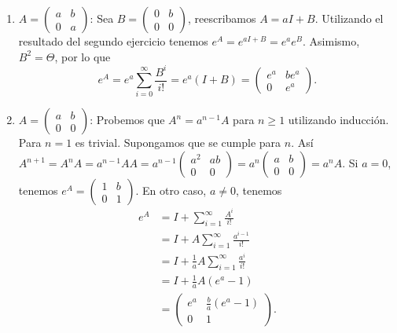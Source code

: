 \documentclass{article}
\theoremstyle{definition}
\theoremstyle{remark}
\begin{document}
\begin{enumerate}
  \item
    $ A = \begin{pmatrix} a & b \\ 0 & a \end{pmatrix}$:
    Sea $B = \begin{pmatrix}0 & b \\ 0 & 0\end{pmatrix}$,
    reescribamos $A = a I + B$.
    Utilizando el resultado del segundo ejercicio tenemos
    $
      e^A = e^{aI + B} = e^a e^B.
    $
    Asimismo, $B^2 = \Theta$, por lo que
    \[
      e^A = e^a \sum_{i = 0}^{\infty} \frac{B^i}{i!} = e^a (I + B) =
      \begin{pmatrix} e^a & b e^a \\ 0 & e^a \end{pmatrix}.
    \]
  \item
    $ A = \begin{pmatrix} a & b \\ 0 & 0 \end{pmatrix}$:
    Probemos que $A^n = a^{n - 1} A$ para $n \geq 1$ utilizando inducci\'on.
    Para $n = 1$ es trivial. Supongamos que se cumple para $n$. As\'i
    $
    A^{n + 1} = A^n A = a^{n - 1} A A =
    a^{n - 1} \begin{pmatrix} a^2 & ab \\ 0 & 0 \end{pmatrix} =
    a^n \begin{pmatrix} a & b \\ 0 & 0 \end{pmatrix} =
    a^n A.
    $
    Si $a = 0$, tenemos $e^A =
    \begin{pmatrix}
        1 & b \\
        0 & 1
    \end{pmatrix}$.
    En otro caso, $a \neq 0$, tenemos
    \begin{align*}
      e^A &= I + \sum_{i = 1}^{\infty} \frac{A^i}{i!}\\
      &= I + A \sum_{i = 1}^{\infty} \frac{a^{i - 1}}{i!}\\
      &= I + \frac{1}{a} A \sum_{i = 1}^{\infty} \frac{a^i}{i!}\\
      &= I + \frac{1}{a} A (e^a - 1)\\
      &= \begin{pmatrix} e^a & \frac{b}{a}(e^a - 1) \\ 0 & 1\end{pmatrix}.
    \end{align*}

\end{enumerate}
\end{document}
